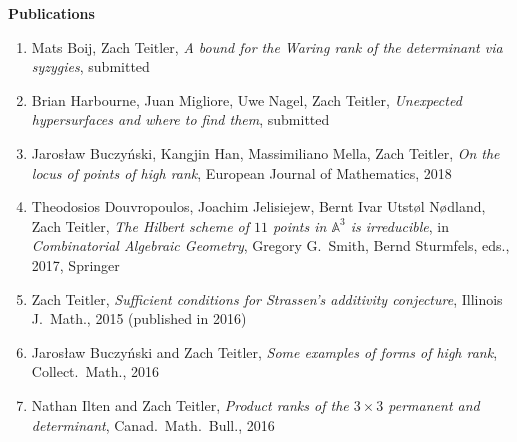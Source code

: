 \documentclass[12pt]{article}
\begin{document}





\textbf{Publications}
\begin{enumerate}

\item Mats Boij, Zach Teitler,
\emph{A bound for the Waring rank of the determinant via syzygies},
submitted

\item Brian Harbourne, Juan Migliore, Uwe Nagel, Zach Teitler,
\emph{Unexpected hypersurfaces and where to find them},
submitted

\item Jaros{\l}aw Buczy\'nski, Kangjin Han, Massimiliano Mella, Zach Teitler,
\emph{On the locus of points of high rank},
European Journal of Mathematics, 2018

\item Theodosios Douvropoulos, Joachim Jelisiejew, Bernt Ivar Utst{\o}l N{\o}dland, Zach Teitler,
\emph{The Hilbert scheme of $11$ points in $\mathbb{A}^3$ is irreducible},
in \emph{Combinatorial Algebraic Geometry}, Gregory G.\ Smith, Bernd Sturmfels, eds., 2017, Springer

\item Zach Teitler,
\emph{Sufficient conditions for Strassen's additivity conjecture},
Illinois J.\ Math.,
2015
(published in 2016)

\item Jaros{\l}aw Buczy\'nski and Zach Teitler,
\emph{Some examples of forms of high rank},
Collect.\ Math.,
2016

\item Nathan Ilten and Zach Teitler,
\emph{Product ranks of the $3 \times 3$ permanent and determinant},
Canad.\ Math.\ Bull.,
2016


\end{enumerate}
\end{document}
